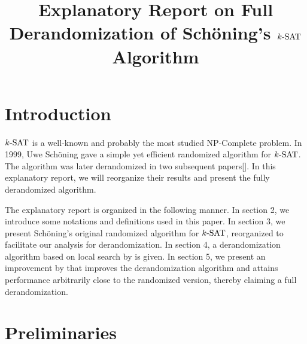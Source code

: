 \documentclass[a4paper,12pts]{article}
\title{Explanatory Report on Full Derandomization of Sch\"{o}ning's $\SAT$ Algorithm}
\author{}
\date{}
\newcommand{\SAT}{\textnormal{$k$-SAT}}
\begin{document}
\maketitle

\section{Introduction}
\paragraph{} $\SAT$ is a well-known and probably the most studied NP-Complete problem. In 1999, Uwe Sch\"{o}ning gave a simple yet efficient randomized algorithm for $\SAT$\cite{Schoning99}. The algorithm was later derandomized in two subsequent papers[\cite{Dantsin02,Moser11}]. In this explanatory report, we will reorganize their results and present the fully derandomized algorithm.\par 
The explanatory report is organized in the following manner. In section 2, we introduce some notations and definitions used in this paper. In section 3, we present Sch\"{o}ning's original randomized algorithm\cite{Schoning99} for $\SAT$, reorganized to facilitate our analysis for derandomization. In section 4, a derandomization algorithm based on local search by \cite{Dantsin02} is given. In section 5, we present an improvement by \cite{Moser11} that improves the derandomization algorithm and attains performance arbitrarily close to the randomized version, thereby claiming a full derandomization.

\section{Preliminaries}
\end{document}
